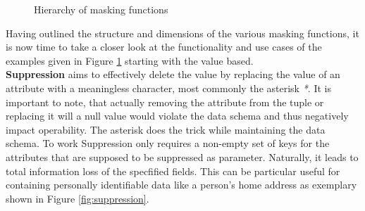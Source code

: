 \begin{figure}[ht]
    \caption{Hierarchy of masking functions}\label{fig:hierarchy_mf} 
\end{figure}

Having outlined the structure and dimensions of the various masking functions, it is now time to take a closer look at the functionality and use cases of the examples given in Figure \ref{fig:hierarchy_mf} starting with the value based. \\
\textbf{Suppression} aims to effectively delete the value by replacing the value of an attribute with a meaningless character, most commonly the asterisk \textit{*}. It is important to note, that actually removing the attribute from the tuple or replacing it will a null value would violate the data schema and thus negatively impact operability. The asterisk does the trick while maintaining the data schema. To work Suppression only requires a non-empty set of keys for the attributes that are supposed to be suppressed as parameter. Naturally, it leads to total information loss of the specfified fields. This can be particular useful for containing personally identifiable data like a person's home address as exemplary shown in Figure \ref{fig:suppression}. 

\bigskip

